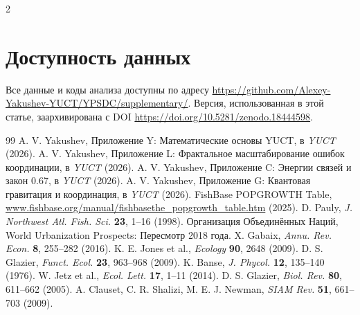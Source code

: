 \documentclass[11pt,a4paper]{article}
\begin{document}
\begin{multicols}{2}
		\section*{Доступность данных}
		
		Все данные и коды анализа доступны по адресу \url{https://github.com/Alexey-Yakushev-YUCT/YPSDC/supplementary/}. Версия, использованная в этой статье, заархивирована с DOI \url{https://doi.org/10.5281/zenodo.18444598}.
		
		\begin{thebibliography}{99}
			 A. V. Yakushev, Приложение Y: Математические основы YUCT, в \emph{YUCT} (2026).
			 A. V. Yakushev, Приложение L: Фрактальное масштабирование ошибок координации, в \emph{YUCT} (2026).
			 A. V. Yakushev, Приложение C: Энергии связей и закон 0.67, в \emph{YUCT} (2026).
			 A. V. Yakushev, Приложение G: Квантовая гравитация и координация, в \emph{YUCT} (2026).
			 FishBase POPGROWTH Table, \url{www.fishbase.org/manual/fishbasethe_popgrowth_table.htm} (2025).
			 D. Pauly, \emph{J. Northwest Atl. Fish. Sci.} \textbf{23}, 1–16 (1998).
			 Организация Объединённых Наций, World Urbanization Prospects: Пересмотр 2018 года.
			 X. Gabaix, \emph{Annu. Rev. Econ.} \textbf{8}, 255–282 (2016).
			 K. E. Jones et al., \emph{Ecology} \textbf{90}, 2648 (2009).
			 D. S. Glazier, \emph{Funct. Ecol.} \textbf{23}, 963–968 (2009).
			 K. Banse, \emph{J. Phycol.} \textbf{12}, 135–140 (1976).
			 W. Jetz et al., \emph{Ecol. Lett.} \textbf{17}, 1–11 (2014).
			 D. S. Glazier, \emph{Biol. Rev.} \textbf{80}, 611–662 (2005).
			 A. Clauset, C. R. Shalizi, M. E. J. Newman, \emph{SIAM Rev.} \textbf{51}, 661–703 (2009).
		\end{thebibliography}
		
	\end{multicols}
\end{document}
